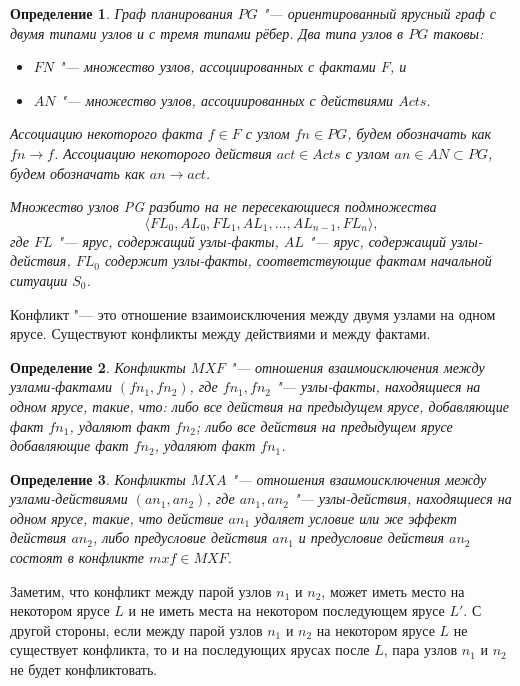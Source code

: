 \documentclass[b5paper,11pt]{book}
\newtheorem{Def}{Определение}
\begin{document}
	\begin{Def}
		Граф планирования $PG$ "--- ориентированный ярусный граф с двумя типами узлов и с тремя типами рёбер.	Два типа узлов в $PG$ таковы: 
		\begin{itemize}
			\item $FN$ "--- множество узлов, ассоциированных с фактами $F$, и 
			\item $AN$ "--- множество узлов, ассоциированных с действиями $Acts$.
		\end{itemize}

		Ассоциацию некоторого факта $f\in F$ с узлом $fn\in PG$, будем обозначать как $fn\rightarrow f$. Ассоциацию некоторого действия $act\in Acts$ с узлом $an\in AN\subset PG$, будем обозначать как $an\rightarrow act$.
		
		Множество узлов PG разбито на не пересекающиеся подмножества 
		\[
			\langle FL_0, AL_0, FL_1, AL_1, \dots, AL_{n-1}, FL_n\rangle,
		\]
		где $FL$ "--- ярус, содержащий узлы-факты, $AL$ "--- ярус, содержащий узлы-действия, $FL_0$ содержит узлы-факты, соответствующие фактам начальной ситуации $S_0$.
		
	\end{Def}

	Конфликт "--- это отношение взаимоисключения между двумя узлами на одном ярусе. Существуют конфликты между действиями и между фактами.

	\begin{Def}
		Конфликты $MXF$ "--- отношения взаимоисключения между узлами-фактами $(fn_1, fn_2)$, где $fn_1, fn_2$ "--- узлы-факты, находящиеся на одном ярусе, такие, что: либо все действия на предыдущем ярусе, добавляющие факт $fn_1$, удаляют факт $fn_2$; либо все действия на предыдущем ярусе добавляющие факт $fn_2$, удаляют факт $fn_1$.
	\end{Def}
	
	\begin{Def}
		Конфликты $MXA$ "--- отношения взаимоисключения между узлами-действиями $(an_1, an_2)$, где $an_1, an_2$ "--- узлы-действия, находящиеся на одном ярусе, такие, что действие $an_1$ удаляет условие	или же эффект действия $an_2$, либо предусловие действия $an_1$ и предусловие действия $an_2$ состоят в конфликте $mxf\in MXF$.
	\end{Def}

	Заметим, что конфликт между парой узлов $n_1$ и $n_2$, может иметь место на некотором ярусе $L$ и не иметь места на некотором последующем ярусе $L'$. С другой стороны, если между парой узлов $n_1$ и $n_2$ на некотором ярусе $L$ не существует конфликта, то и на последующих ярусах после $L$, пара узлов $n_1$ и $n_2$ не будет конфликтовать.
	
\end{document}
